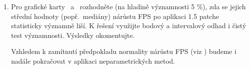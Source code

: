 \begin{enumerate}[label=\alph*)]
\begin{minipage}{0.94\textwidth}
        \label{tab:interval-estimation}
        \vspace{0.5em}
        \renewcommand{\arraystretch}{1.3}
    \end{minipage}

    \newpage
    \item Pro grafické karty \nvidiaCard\ a \amdCard\ rozhodněte (na hladině významnosti 5 \%), zda se jejich střední hodnoty (popř.\ mediány)
    nárůstu FPS po aplikaci 1.5 patche statisticky významně liší.
    K řešení využijte bodový a intervalový odhad i čistý test významnosti.
    Výsledky okomentujte.

    \vspace{1em}
    \begin{minipage}{0.94\textwidth}
        Vzhledem k zamítnutí předpokladu normality nárůstu FPS (viz ) budeme i nadále pokračovat v aplikaci neparametrických metod.


        \label{tab:median-comparison}
        \vspace{0.5em}
        \renewcommand{\arraystretch}{1.3}
        \vspace{1em}


\end{minipage}
\end{enumerate}
